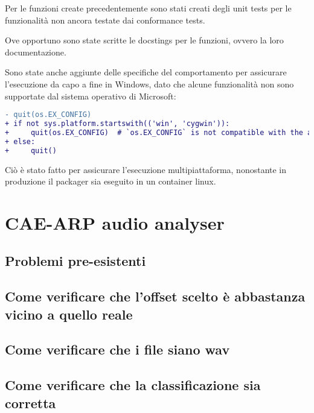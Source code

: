 Per le funzioni create precedentemente sono stati creati degli unit tests per le funzionalità non ancora testate dai conformance tests.

Ove opportuno sono state scritte le docstings per le funzioni, ovvero la loro documentazione.

Sono state anche aggiunte delle specifiche del comportamento per assicurare l'esecuzione da capo a fine in Windows, dato che alcune funzionalità non sono supportate dal sistema operativo di Microsoft:
\begin{lstlisting}[language=diff]
- quit(os.EX_CONFIG)
+ if not sys.platform.startswith(('win', 'cygwin')):
+     quit(os.EX_CONFIG)  # `os.EX_CONFIG` is not compatible with the above platforms in Python 3.10
+ else:
+     quit()
\end{lstlisting}
Ciò è stato fatto per assicurare l'esecuzione multipiattaforma, nonostante in produzione il packager sia eseguito in un container linux.






\section{\acs{CAE}-\acs{ARP} audio analyser}
\subsection{Problemi pre-esistenti} %
\subsection{Come verificare che l'offset scelto è abbastanza vicino a quello reale} %
\subsection{Come verificare che i file siano wav}   %
\subsection{Come verificare che la classificazione sia corretta}    %
